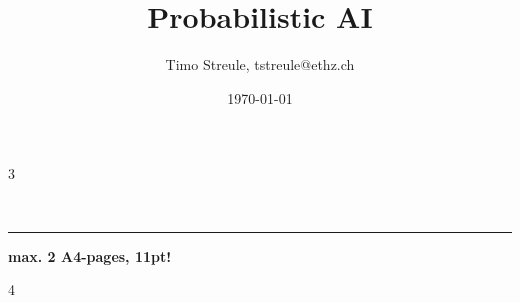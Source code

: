 \documentclass[%
,a4paper
,fontsize=10pt %
,landscape
,pagesize
,headinclude
]{scrartcl}
\title{Probabilistic AI}
\author{Timo Streule, tstreule@ethz.ch}
\date{\today}
\begin{document}

    \begin{multicols*}{3}


        \maketitle

        
        
        
        
        

        ~\vfill\parbox{\linewidth}{\hrule\medskip\hrulefill\centering\textbf{ max. 2 A4-pages, 11pt! }\hrulefill}

    \end{multicols*}
    \begin{multicols*}{4}
        
        
    \end{multicols*}
\end{document}
